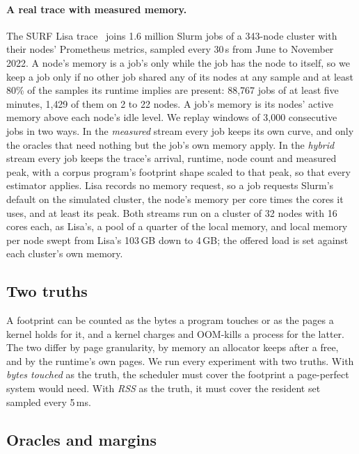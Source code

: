\documentclass[11pt]{article}
\newcommand{\term}[1]{\emph{#1}}
\begin{document}
\paragraph{A real trace with measured memory.} The SURF Lisa trace~\cite{LisaTrace} joins 1.6 million Slurm jobs of a
343-node cluster with their nodes' Prometheus metrics, sampled every 30\,s from June to November 2022. A node's memory is a
job's only while the job has the node to itself, so we keep a job only if no other job shared any of its nodes at any
sample and at least 80\% of the samples its runtime implies are present: 88{,}767 jobs of at least five minutes, 1{,}429
of them on 2 to 22 nodes. A job's memory is its nodes' active memory above each node's idle level. We replay windows of
3{,}000 consecutive jobs in two ways. In the \term{measured} stream every job keeps its own curve, and only the oracles
that need nothing but the job's own memory apply. In the \term{hybrid} stream every job keeps the trace's arrival,
runtime, node count and measured peak, with a corpus program's footprint shape scaled to that peak, so that every
estimator applies. Lisa records no memory request, so a job requests Slurm's default on the simulated cluster, the node's
memory per core times the cores it uses, and at least its peak. Both streams run on a cluster of 32 nodes with 16 cores
each, as Lisa's, a pool of a quarter of the local memory, and local memory per node swept from Lisa's 103\,GB down to
4\,GB; the offered load is set against each cluster's own memory.

\subsection{Two truths}
\label{sec:truths}

A footprint can be counted as the bytes a program touches or as the pages a kernel holds for it, and a kernel charges and
OOM-kills a process for the latter. The two differ by page granularity, by memory an allocator keeps after a free, and by
the runtime's own pages. We run every experiment with two truths. With \term{bytes touched} as the truth, the scheduler
must cover the footprint a page-perfect system would need. With \term{RSS} as the truth, it must cover the resident set
sampled every 5\,ms.

\subsection{Oracles and margins}
\label{sec:oracles}
\end{document}
